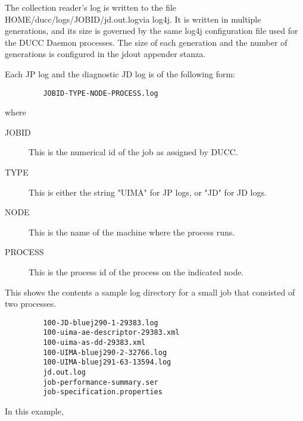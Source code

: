  The collection reader's log is written to the file HOME/ducc/logs/JOBID/jd.out.logvia log4j. 
 It is written in multiple generations, and its size is governed by the same log4j configuration file 
 used for the DUCC Daemon processes. The size of each generation and the number of generations 
 is configured in the jdout appender stanza. 

 Each JP log and the diagnostic JD log is of the following form:

\begin{verbatim}
         JOBID-TYPE-NODE-PROCESS.log 
\end{verbatim}
 
 where 

\begin{description}
    \item[JOBID] This is the numerical id of the job as assigned by DUCC.
    \item[TYPE] This is either the string "UIMA" for JP logs, or "JD" for JD logs.
    \item[NODE] This is the name of the machine where the process runs.
    \item[PROCESS] This is the process id of the process on the indicated node.
\end{description}

This shows the contents a sample log directory for a small job that consisted of two processes.

\begin{verbatim}
         100-JD-bluej290-1-29383.log 
         100-uima-ae-descriptor-29383.xml 
         100-uima-as-dd-29383.xml 
         100-UIMA-bluej290-2-32766.log 
         100-UIMA-bluej291-63-13594.log 
         jd.out.log 
         job-performance-summary.ser 
         job-specification.properties 
\end{verbatim}

In this example, 

